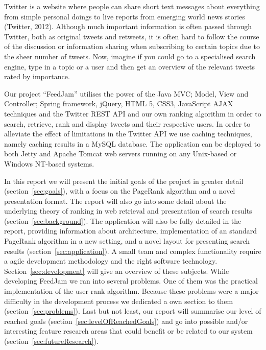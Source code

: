 Twitter is a website where people can share short text messages about everything from simple personal doings to live reports from emerging world news stories (Twitter, 2012). Although much important information is often passed through Twitter, both as original tweets and retweets, it is often hard to follow the course of the discussion or information sharing when subscribing to certain topics due to the sheer number of tweets. Now, imagine if you could go to a specialised search engine, type in a topic or a user and then get an overview of the relevant tweets rated by importance.

Our project “FeedJam” utilises the power of the Java MVC; Model, View and Controller; Spring framework, jQuery, HTML 5, CSS3, JavaScript AJAX techniques and the Twitter REST API and our own ranking algorithm in order to search, retrieve, rank and display tweets and their respective users. In order to alleviate the effect of limitations in the Twitter API we use caching techniques, namely caching results in a MySQL database. The application can be deployed to both Jetty and Apache Tomcat web servers running on any Unix-based or Windows NT-based systems.

In this report we will present the initial goals of the project in greater detail (section~\ref{sec:goals}), with a focus on the PageRank algorithm and a novel presentation format. The report will also go into some detail about the underlying theory of ranking in web retrieval and presentation of search results (section~\ref{sec:background}). The application will also be fully detailed in the report, providing information about architecture, implementation of an standard PageRank algorithm in a new setting, and a novel layout for presenting search results (section~\ref{sec:application}). A small team and complex functionality require a agile development methodology and the right software technology. Section~\ref{sec:development} will give an overview of these subjects. While developing FeedJam we ran into several problems. One of them was the practical implementation of the user rank algorithm. Because these problems were a major difficulty in the development process we dedicated a own section to them (section~\ref{sec:problems}). Last but not least, our report will summarise our level of reached goals (section~\ref{sec:levelOfReachedGoals}) and go into possible and/or interesting feature research areas that could benefit or be related to our system (section~\ref{sec:futureResearch}).